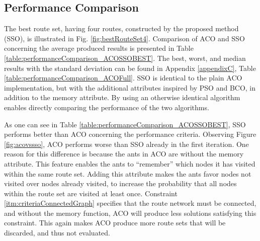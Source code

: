 \subsection{Performance Comparison}
\label{subsec:performanceComparisonDiscussion}


The best route set, having four routes, constructed by the proposed method (SSO), is illustrated in Fig. \vref{fig:bestRouteSet4}. Comparison of ACO and SSO concerning the average produced results is presented in Table \vref{table:performanceComparison_ACOSSOBEST}. The best, worst, and median results with the standard deviation can be found in Appendix \ref{appendixC}, Table \vref{table:performanceComparison_ACOFull}. SSO is identical to the plain ACO implementation, but with the additional attributes inspired by PSO and BCO, in addition to the memory attribute. By using an otherwise identical algorithm enables directly comparing the performance of the two algorithms. 

As one can see in Table \vref{table:performanceComparison_ACOSSOBEST}, SSO performs better than ACO concerning the performance criteria. Observing Figure \ref{fig:acovssso}, ACO performs worse than SSO already in the first iteration. One reason for this difference is because the ants in ACO are without the memory attribute. This feature enables the ants to ``remember'' which nodes it has visited within the same route set. Adding this attribute makes the ants favor nodes not visited over nodes already visited, to increase the probability that all nodes within the route set are visited at least once. Constraint \vref{itm:criteriaConnectedGraph} specifies that the route network must be connected, and without the memory function, ACO will produce less solutions satisfying this constraint. This again makes ACO produce more route sets that will be discarded, and thus not evaluated. %

